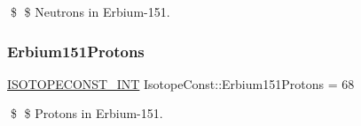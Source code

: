 \$ \$ Neutrons in Erbium-\/151. \mbox{\label{group___isotope_const-_erbium-_er151_gac02b4fea50718a36bfa658124609d28b}} 
\subsubsection{\texorpdfstring{Erbium151\+Protons}{Erbium151Protons}}
{\footnotesize\ttfamily \mbox{\hyperlink{group___isotope_const-_macros_ga5f18360b3e99483a35c32d789e62621c}{I\+S\+O\+T\+O\+P\+E\+C\+O\+N\+S\+T\+\_\+\+I\+NT}} Isotope\+Const\+::\+Erbium151\+Protons = 68}

\$ \$ Protons in Erbium-\/151. 